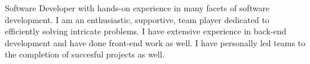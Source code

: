 
\begin{cvparagraph}
Software Developer with hands-on experience in many facets of software development.  I am an enthusiastic, supportive, team player dedicated to efficiently solving intricate problems.  I have extensive experience in back-end development and have done front-end work as well.  I have personally led teams to the completion of succesful projects as well.
\end{cvparagraph}
